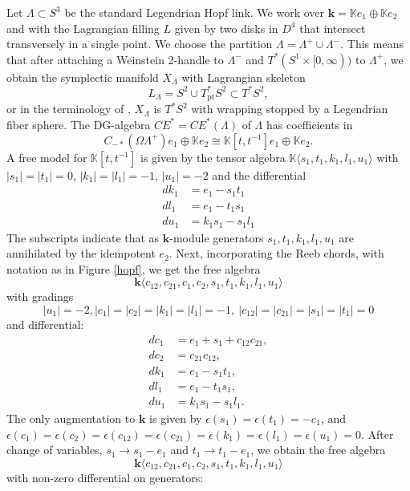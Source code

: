 \documentclass{gtpart}
\renewcommand{\k}{\mathbf{k}}
\newcommand{\K}{\mathbb{K}}
\begin{document}
Let $\Lambda \subset S^3$ be the standard Legendrian Hopf link. We work over $\k =
\mathbb{K} e_1 \oplus \mathbb{K} e_2$ and with the Lagrangian filling $L$ given by two disks in $D^4$ that intersect transversely in a single point.
We choose the partition $\Lambda = \Lambda^+ \cup \Lambda^-$. This means that after attaching a Weinstein 2-handle to $\Lambda^{-}$ and $T^{\ast}(S^{1}\times[0,\infty))$ to $\Lambda^{+}$, we obtain the symplectic manifold $X_{\Lambda}$ with Lagrangian skeleton 
\[ L_\Lambda = S^2 \cup T_{\mathrm{pt}}^* S^2 \subset T^{\ast} S^{2}, \]
or in the terminology of \cite{sylvan}, $X_{\Lambda}$ is $T^{\ast}S^{2}$ with wrapping stopped by a Legendrian fiber sphere.   
The DG-algebra $CE^{\ast}=CE^*(\Lambda)$ of $\Lambda$ has coefficients in 
\[C_{-*}(\Omega \Lambda^+) e_1 \oplus \mathbb{K} e_2 \cong \K[t,t^{-1}] e_1 \oplus \K e_2. \]
A free model for $\K[t,t^{-1}]$ is given by the tensor algebra $\K\langle s_1,
t_1, k_1, l_1, u_1 \rangle$ with $|s_1|=|t_1|=0$, $|k_1|=|l_1|=-1$, $|u_1|=-2$ and the differential  
\begin{align*}
    dk_1 &= e_1 - s_1 t_1 \\
    dl_1 &= e_1 - t_1 s_1 \\
    du_1 &= k_1 s_1 - s_1 l_1 
\end{align*}
The subscripts indicate that as $\k$-module generators
$s_1, t_1, k_1, l_1, u_1$ are annihilated by the idempotent $e_2$. 
Next, incorporating the Reeb chords, with notation as in Figure \ref{hopf}, we get the free algebra 
\[  \k \langle c_{12} , c_{21} , c_{1}, c_{2},
s_1, t_1, k_1, l_1, u_1 \rangle \] 
with gradings\[|u_1|=-2, |c_{1}|=|c_{2}| = |k_1|= |l_1|=  -1,\ |c_{12}|=|c_{21}|=|s_1|=|t_1|=0  \] and differential:
\begin{align*} 
    dc_1 &= e_1 + s_1 + c_{12}c_{21}, \\
    dc_2 &= c_{21} c_{12}, \\
    dk_1 &= e_1 - s_1 t_1, \\
    dl_1 &= e_1 - t_1 s_1, \\
    du_1 &= k_1 s_1 - s_1 l_1. 
\end{align*}
The only augmentation to $\k$ is given by $\epsilon(s_1) = \epsilon(t_1) = -e_1$, and
$\epsilon(c_1) = \epsilon(c_2) = \epsilon(c_{12})
=\epsilon(c_{21})=\epsilon(k_1)= \epsilon(l_1)= \epsilon(u_1) = 0$. After change of
variables, $s_1 \to s_1 - e_1$ and $t_1 \to t_1 - e_1$, we obtain the free algebra 
\[ \k \langle c_{12} , c_{21} , c_{1}, c_{2},
s_1, t_1, k_1, l_1, u_1 \rangle \] 
with non-zero differential on generators: 
\end{document}
